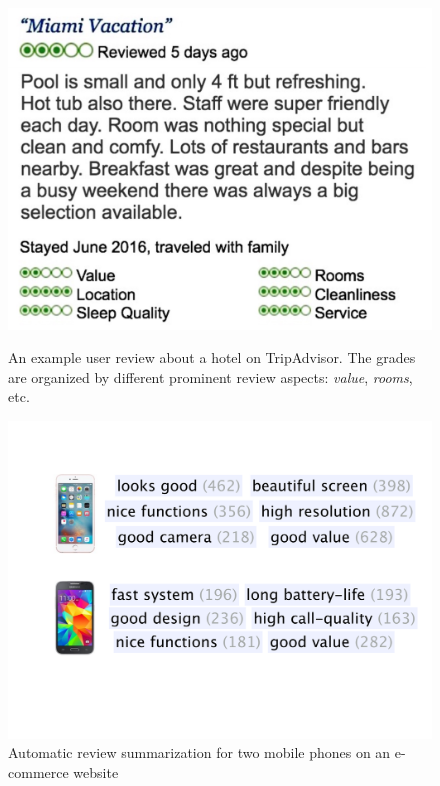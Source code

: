\begin{figure}[th]
	\centering
	\begin{minipage}{0.48\textwidth}
		\centering
		\includegraphics[width=0.7\columnwidth]{figures/tripadvisor}
		\caption{An example user review about a hotel on TripAdvisor. 
			The grades are organized by different prominent review aspects: \textit{value}, \textit{rooms}, etc. }
		\label{fig:tripadvisor}
	\end{minipage}\hfill
	\begin{minipage}{0.48\textwidth}
		\centering
	\includegraphics[width=0.9\columnwidth]{figures/phrases}
	\caption{Automatic review summarization for two mobile phones 
		on an e-commerce website}
	\label{fig:phrases}
\end{minipage}
\end{figure}

%


